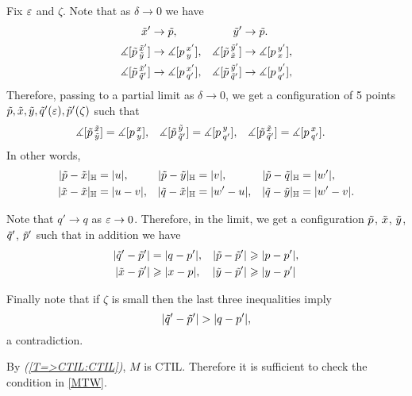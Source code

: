 Fix $\eps$ and $\zeta$.
Note that as $\delta\to 0$ we have 
\begin{align*}
\~x'&\to \~p,
&
\~y'&\to \~p.
\\
\measuredangle[\~p\,^{\~x'}_{\~y}]&\to \measuredangle[p\,^{x'}_{y}],
&
\measuredangle[\~p\,^{\~y'}_{\~x}]&\to \measuredangle[p\,^{y'}_{x}],
\\
\measuredangle[\~p\,^{\~x'}_{\~q'}]&\to \measuredangle[p\,^{x'}_{q'}],
&
\measuredangle[\~p\,^{\~y'}_{\~q'}]&\to \measuredangle[p\,^{y'}_{q'}],
\end{align*}
Therefore, passing to a partial limit as $\delta\to0$, we get a configuration of 5 points 
$\~p, \~x,\~y,\~q'(\eps),\~p'(\zeta)$ such that  
\begin{align*}
\measuredangle[\~p\,^{\~x}_{\~y}]&= \measuredangle[p\,^{x}_{y}],
&
\measuredangle[\~p\,^{\~y}_{\~q'}]&= \measuredangle[p\,^{y}_{q'}],
&
\measuredangle[\~p\,^{\~x}_{\~q'}]&= \measuredangle[p\,^{x}_{q'}].
\end{align*}
In other words,
\begin{align*}
|\~p -\~x|_\HH&=|u|,
&
|\~p -\~y|_\HH&=|v|,
&
|\~p -\~q|_\HH&=|w'|,
\\
|\~x -\~x|_\HH&=|u-v|,
&
|\~q -\~x|_\HH&=|w'-u|,
&
|\~q -\~y|_\HH&=|w'-v|.
\end{align*}


Note that $q'\to q$ as $\eps\to0$. 
Therefore, in the limit,
we get a configuration $\~p$, $\~x$, $\~y$, $\~q'$, $\~p'$ such that in addition we have
\begin{align*}
|\~q'-\~p'|&=|q-p'|,
&
|\~p-\~p'|&\ge |p-p'|,
\\
|\~x-\~p'|&\ge |x-p|,
&
|\~y-\~p'|&\ge |y-p'|
\end{align*}

Finally note that if $\zeta$ is small then the last three inequalities 
imply 
\[|\~q'-\~p'|>|q-p'|,\]
a contradiction.





By \textit{(\ref{T=>CTIL:CTIL})}, $M$ is CTIL.
Therefore it is sufficient to check the condition in \ref{MTW}.

\begin{wrapfigure}{r}{26 mm}
\end{wrapfigure}


